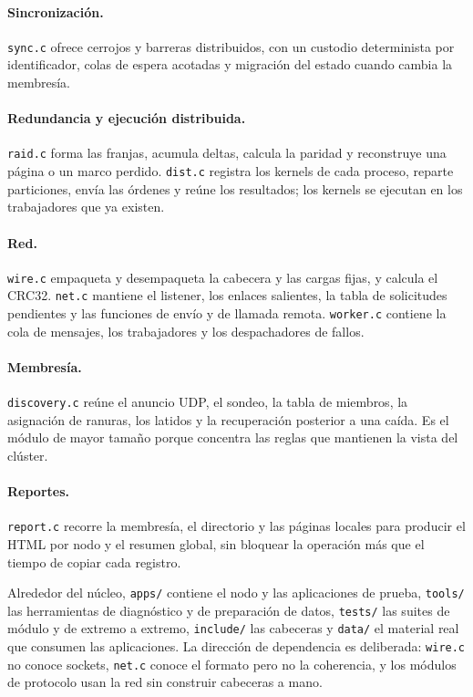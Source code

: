 \paragraph{Sincronización.} \texttt{sync.c} ofrece cerrojos y barreras distribuidos, con un custodio determinista por identificador, colas de espera acotadas y migración del estado cuando cambia la membresía.

\paragraph{Redundancia y ejecución distribuida.} \texttt{raid.c} forma las franjas, acumula deltas, calcula la paridad y reconstruye una página o un marco perdido. \texttt{dist.c} registra los kernels de cada proceso, reparte particiones, envía las órdenes y reúne los resultados; los kernels se ejecutan en los trabajadores que ya existen.

\paragraph{Red.} \texttt{wire.c} empaqueta y desempaqueta la cabecera y las cargas fijas, y calcula el CRC32. \texttt{net.c} mantiene el listener, los enlaces salientes, la tabla de solicitudes pendientes y las funciones de envío y de llamada remota. \texttt{worker.c} contiene la cola de mensajes, los trabajadores y los despachadores de fallos.

\paragraph{Membresía.} \texttt{discovery.c} reúne el anuncio UDP, el sondeo, la tabla de miembros, la asignación de ranuras, los latidos y la recuperación posterior a una caída. Es el módulo de mayor tamaño porque concentra las reglas que mantienen la vista del clúster.

\paragraph{Reportes.} \texttt{report.c} recorre la membresía, el directorio y las páginas locales para producir el HTML por nodo y el resumen global, sin bloquear la operación más que el tiempo de copiar cada registro.

Alrededor del núcleo, \texttt{apps/} contiene el nodo y las aplicaciones de prueba, \texttt{tools/} las herramientas de diagnóstico y de preparación de datos, \texttt{tests/} las suites de módulo y de extremo a extremo, \texttt{include/} las cabeceras y \texttt{data/} el material real que consumen las aplicaciones. La dirección de dependencia es deliberada: \texttt{wire.c} no conoce sockets, \texttt{net.c} conoce el formato pero no la coherencia, y los módulos de protocolo usan la red sin construir cabeceras a mano.

